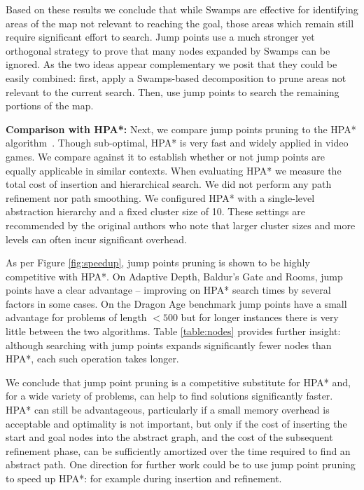 Based on these results we conclude that while Swamps are effective for
identifying areas of the map not relevant to reaching the goal, those areas
which remain still require significant effort to search.  Jump points use a much
stronger yet orthogonal strategy to prove that many nodes expanded by Swamps can
be ignored.  As the two ideas appear complementary we posit that they could be
easily combined: first, apply a Swamps-based decomposition to prune areas not
relevant to the current search.  Then, use jump points to search the remaining
portions of the map.

\textbf{Comparison with HPA*: }
Next, we compare jump points pruning to the HPA* algorithm~\cite{botea04}.
Though sub-optimal, HPA* is very fast and widely applied in video games. We
compare against it to establish whether or not jump points are equally
applicable in similar contexts.  When evaluating HPA* we measure the total cost
of insertion and hierarchical search. We did not perform any path refinement 
nor path smoothing.
We configured HPA* with a single-level abstraction hierarchy and a
fixed cluster size of 10.  These settings are recommended by the original
authors who note that larger cluster sizes and more levels can often incur
significant overhead.

As per Figure \ref{fig:speedup}, jump points pruning is shown to be 
highly competitive with HPA*.
On Adaptive Depth, Baldur's Gate and Rooms, jump points have a clear advantage
-- improving on HPA* search times by several factors in some cases.
On the Dragon Age benchmark jump points have a small advantage for problems of 
length $< 500$ but for longer instances there is very little between the two
algorithms.
Table \ref{table:nodes} provides further insight: although searching with jump 
points expands significantly fewer nodes than HPA*, each such operation
takes longer.

We conclude that jump point pruning is a competitive substitute for HPA* and,
for a wide variety of problems, can help to find solutions significantly faster.
HPA*
can still be advantageous, particularly if a small memory overhead is acceptable
and optimality is not important, but only if the cost of inserting the start and
goal nodes into the abstract graph, and the cost of the subsequent refinement
phase, can be sufficiently amortized over the time required to find an abstract
path.
One direction for further work could be to use jump
point pruning to speed up HPA*: for example during insertion and refinement.

